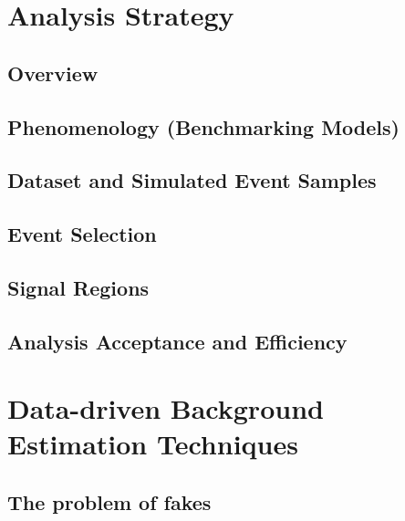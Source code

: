 \documentclass{outhesis}
\begin{document}
\chapter{Analysis Strategy}\label{chap:strategy}
\graphicspath{{figures/strategy/}}
\section{Overview}\label{sec:strategy.overview}

\section{Phenomenology (Benchmarking Models)}\label{sec:strategy.pheno}

\section{Dataset and Simulated Event Samples}\label{sec:strategy.samples}

\section{Event Selection}\label{sec:strategy.sel}

\section{Signal Regions}\label{sec:strategy.sr}

\section{Analysis Acceptance and Efficiency}\label{sec:strategy.sr}


\chapter{Data-driven Background Estimation Techniques}\label{chap:fake}
\graphicspath{{figures/fake/}}
\section{The problem of fakes}\label{sec:fake.prob}

\end{document}
